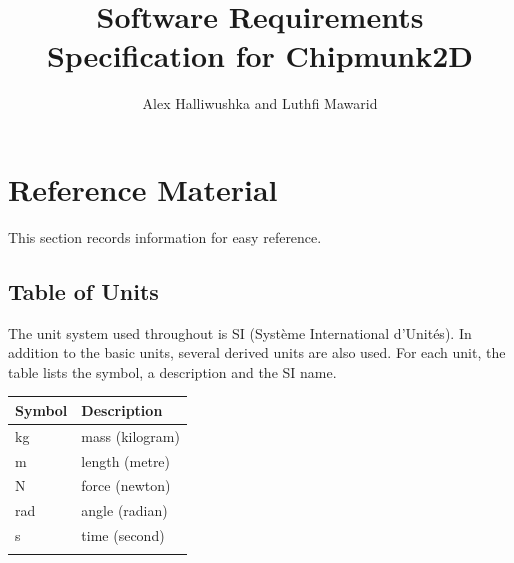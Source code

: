 \documentclass[12pt]{article}
\title{Software Requirements Specification for Chipmunk2D}
\author{Alex Halliwushka and Luthfi Mawarid}
\begin{document}
\maketitle
\tableofcontents
\newpage
\section{Reference Material}
\label{Sec:RefMat}
This section records information for easy reference.
\subsection{Table of Units}
\label{Sec:ToU}
The unit system used throughout is SI (Système International d'Unités). In addition to the basic units, several derived units are also used. For each unit, the table lists the symbol, a description and the SI name.
\begin{longtable*}{l l}
\toprule
Symbol & Description
\\
\midrule
\endhead
kg & mass (kilogram)
\\
m & length (metre)
\\
N & force (newton)
\\
rad & angle (radian)
\\
s & time (second)
\\
\bottomrule
\label{Table:ToU}
\end{longtable*}
\end{document}
